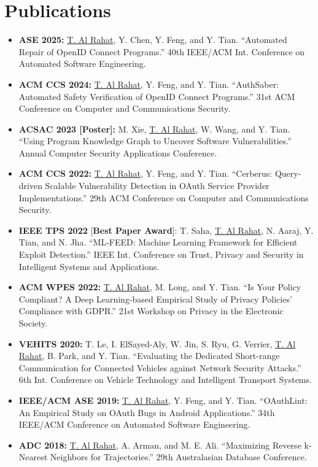 \documentclass[11pt,letterpaper]{article}
\newcommand{\venue}[1]{\textbf{\textcolor{accent}{#1}}}
\newcommand{\me}{\underline{T. Al Rahat}}
\begin{document}
\section{Publications}
\begin{itemize}[itemsep=5pt]
  \item \venue{ASE 2025:} \me{}, Y. Chen, Y. Feng, and Y. Tian. ``Automated Repair of
        OpenID Connect Programs.'' 40th IEEE/ACM Int. Conference on Automated Software
        Engineering.

  \item \venue{ACM CCS 2024:} \me{}, Y. Feng, and Y. Tian. ``AuthSaber: Automated Safety
        Verification of OpenID Connect Programs.'' 31st ACM Conference on Computer and
        Communications Security.

  \item \venue{ACSAC 2023 [Poster]:} M. Xie, \me{}, W. Wang, and Y. Tian. ``Using Program
        Knowledge Graph to Uncover Software Vulnerabilities.'' Annual Computer Security
        Applications Conference.

  \item \venue{ACM CCS 2022:} \me{}, Y. Feng, and Y. Tian. ``Cerberus: Query-driven Scalable
        Vulnerability Detection in OAuth Service Provider Implementations.'' 29th ACM
        Conference on Computer and Communications Security.

  \item \venue{IEEE TPS 2022} [\textbf{Best Paper Award}]: T. Saha, \me{}, N. Aaraj, Y. Tian,
        and N. Jha. ``ML-FEED: Machine Learning Framework for Efficient Exploit Detection.''
        IEEE Int. Conference on Trust, Privacy and Security in Intelligent Systems and
        Applications.

  \item \venue{ACM WPES 2022:} \me{}, M. Long, and Y. Tian. ``Is Your Policy Compliant?
        A Deep Learning-based Empirical Study of Privacy Policies' Compliance with GDPR.''
        21st Workshop on Privacy in the Electronic Society.

  \item \venue{VEHITS 2020:} T. Le, I. ElSayed-Aly, W. Jin, S. Ryu, G. Verrier, \me{},
        B. Park, and Y. Tian. ``Evaluating the Dedicated Short-range Communication for
        Connected Vehicles against Network Security Attacks.'' 6th Int. Conference on
        Vehicle Technology and Intelligent Transport Systems.

  \item \venue{IEEE/ACM ASE 2019:} \me{}, Y. Feng, and Y. Tian. ``OAuthLint: An Empirical
        Study on OAuth Bugs in Android Applications.'' 34th IEEE/ACM Conference on Automated
        Software Engineering.

  \item \venue{ADC 2018:} \me{}, A. Arman, and M. E. Ali. ``Maximizing Reverse k-Nearest
        Neighbors for Trajectories.'' 29th Australasian Database Conference.
\end{itemize}
\end{document}
